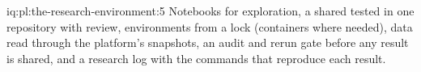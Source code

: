 \begin{solution}{iq:pl:the-research-environment:5}
Notebooks for exploration, a shared tested  in one repository with review, environments from a lock (containers where needed),
data read through the platform's snapshots, an audit and rerun gate before any result is shared, and a research log with the commands that
reproduce each result.
\end{solution}
